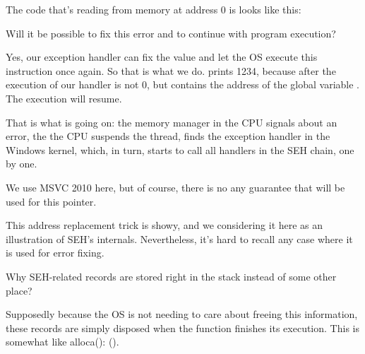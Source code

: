 The code that's reading from memory at address 0 is looks like this:



Will it be possible to fix this error  and to continue with program execution?

Yes, our exception handler can fix the \EAX value and let the \ac{OS} execute this instruction once again.
So that is what we do. \printf prints 1234, because after the execution of our handler \EAX is not 0,
but contains the address of the global variable .
The execution will resume.

That is what is going on: the memory manager in the \ac{CPU} signals about an error, the the \ac{CPU} suspends the thread,
finds the exception handler in the Windows kernel, 
which, in turn, starts to call all handlers in the \ac{SEH} chain, one by one.

We use MSVC 2010 here, but of course, there is no any guarantee that \EAX will be used for this pointer.

This address replacement trick is showy, and we considering it here as an illustration of \ac{SEH}'s internals.
Nevertheless, it's hard to recall any case where it is used for  error fixing.

Why SEH-related records are stored right in the stack instead of some other place?

Supposedly because the \ac{OS} is not needing to care about freeing this information, 
these records are simply disposed when the function finishes its execution.
This is somewhat like alloca(): ().


